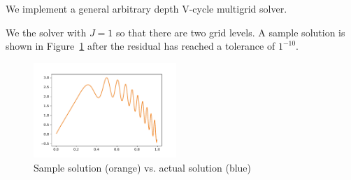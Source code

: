 \documentclass[10pt]{article}
\begin{document}
\begin{solution}[Solution]

We implement a general arbitrary depth V-cycle multigrid solver.



We the solver with \( J=1 \) so that there are two grid levels. A sample solution is shown in Figure~\ref{sol} after the residual has reached a tolerance of \( 1^{-10} \).
\begin{figure}[H]\centering
    \includegraphics[width=0.48\textwidth]{img/mg_2_sol.pdf}
    \caption{Sample solution (orange) vs. actual solution (blue)}
\label{sol}
\end{figure}


\end{solution}
\end{document}
